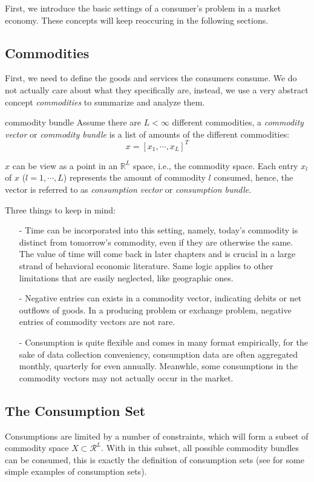 First, we introduce the basic settings of a consumer's problem in a market economy. These concepts will keep reoccuring in the following sections.

\subsection{Commodities}\label{chap2:sec1:ssec1}
First, we need to define the goods and services the consumers consume. We do not actually care about what they specifically are, instead, we use a very abstract concept \textit{commodities}
to summarize and analyze them.
\begin{definition}{commodity bundle}{}
    Assume there are $L<\infty$ different commodities, a \textit{commodity vector} or \textit{commodity bundle} is a list of amounts of the different commodities:$$x=\left[x_1,\cdots,x_L\right]^T$$
\end{definition}
$x$ can be view as a point in an $\mathbb{R}^L$ space, i.e., the commodity space. Each entry $x_l$ of $x$ ($l=1,\cdots,L$) represents the amount of commodity $l$ consumed, hence, the vector is referred to
as \textit{consumption vector} or \textit{consumption bundle}.

Three things to keep in mind:
\begin{enumerate}
    \item[-] Time can be incorporated into this setting, namely, today's commodity is distinct from tomorrow's commodity, even if they are otherwise the same. The value of time will come back in later chapters and is crucial in a large strand of behavioral economic literature. Same logic applies to other limitations that are easily neglected, like geographic ones.
    \item[-] Negative entries can exists in a commodity vector, indicating debits or net outflows of goods. In a producing problem or exchange problem, negative entries of commodity vectors are not rare.
    \item[-] Consumption is quite flexible and comes in many format empirically, for the sake of data collection conveniency, consumption data are often aggregated monthly, quarterly for even annually. Meanwhle, some consumptions in the commodity vectors may not actually occur in the market.
\end{enumerate}

\subsection{The Consumption Set}\label{chap2:sec1:ssec2}
Consumptions are limited by a number of constraints, which will form a subset of commodity space $X\subset \mathcal{R}^L$. With in this subset, all possible commodity bundles can be 
consumed, this is exactly the definition of consumption sets (see \citet[Page 19-20]{mas1995microeconomic} for some simple examples of consumption sets).

